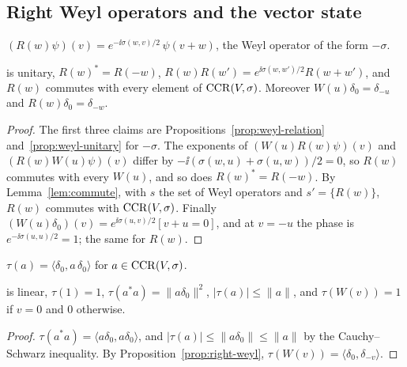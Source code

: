 \subsection{Right Weyl operators and the vector state}

\noindent{}

\begin{definition}\label{def:right-weyl}
$(R(w)\psi)(v)=e^{-\ii\sigma(w,v)/2}\,\psi(v+w)$, the Weyl operator of the form $-\sigma$.
\end{definition}

\begin{proposition}\label{prop:right-weyl}
is unitary, $R(w)^*=R(-w)$, $R(w)R(w')=e^{\ii\sigma(w,w')/2}R(w+w')$, and $R(w)$
commutes with every element of $\operatorname{CCR}(V,\sigma)$. Moreover $W(u)\delta_0=\delta_{-u}$ and
$R(w)\delta_0=\delta_{-w}$.
\end{proposition}
\begin{proof}
The first three claims are Propositions~\ref{prop:weyl-relation} and~\ref{prop:weyl-unitary}
for $-\sigma$. The exponents of $(W(u)R(w)\psi)(v)$ and $(R(w)W(u)\psi)(v)$ differ by
$-\ii(\sigma(w,u)+\sigma(u,w))/2=0$, so $R(w)$ commutes with every $W(u)$, and so does
$R(w)^*=R(-w)$. By Lemma~\ref{lem:commute}, with $s$ the set of Weyl operators and
$s'=\{R(w)\}$, $R(w)$ commutes with $\operatorname{CCR}(V,\sigma)$. Finally
$(W(u)\delta_0)(v)=e^{\ii\sigma(u,v)/2}[v+u=0]$, and at $v=-u$ the phase is
$e^{-\ii\sigma(u,u)/2}=1$; the same for $R(w)$.
\end{proof}

\begin{definition}\label{def:vector-state}
$\tau(a)=\langle\delta_0,a\,\delta_0\rangle$ for $a\in\operatorname{CCR}(V,\sigma)$.
\end{definition}

\begin{proposition}\label{prop:vector-state}
 is linear, $\tau(1)=1$, $\tau(a^*a)=\|a\delta_0\|^2$, $|\tau(a)|\leq\|a\|$, and
$\tau(W(v))=1$ if $v=0$ and $0$ otherwise.
\end{proposition}
\begin{proof}
$\tau(a^*a)=\langle a\delta_0,a\delta_0\rangle$, and $|\tau(a)|\leq\|a\delta_0\|\leq\|a\|$ by
the Cauchy--Schwarz inequality. By Proposition~\ref{prop:right-weyl},
$\tau(W(v))=\langle\delta_0,\delta_{-v}\rangle$.
\end{proof}

